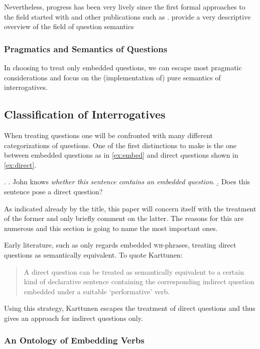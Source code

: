 \documentclass[a4paper,fontsize=12pt]{article}
\newcommand{\term}{\textsf} %
\newcommand{\wh}{\textsc{wh}} %
\theoremstyle{remark} \newtheorem*{termin}{Definition} %
\begin{document}
Nevertheless, progress has been very lively since the first
formal approaches to the field started with \cite{hamblin:q} and other
publications such as %
. \cite{gs:q} provide a very descriptive overview of the field of question
semantics

\subsubsection{Pragmatics and Semantics of Questions}

In choosing to treat only embedded questions, we can escape most pragmatic
considerations and focus on the (implementation of) pure semantics of
interrogatives.

\subsection{Classification of Interrogatives}

When treating questions one will be confronted with many different
categorizations of questions. One of the first distinctions to make is the one
between \term{embedded questions} as in \ref{ex:embed} and \term{direct
questions} shown in \ref{ex:direct}.

\ex. \a. John knows \emph{whether this sentence contains an embedded
question}.\label{ex:embed}
\b. Does this sentence pose a direct question?\label{ex:direct}

As indicated already by the title, this paper will concern itself with the
treatment of the former and only briefly comment on the latter. The reasons for
this are numerous  %
and this section is going to name the most important ones.

Early literature, such as \cite{karttunen:1977} only regards embedded
\wh-phrases, treating direct questions as semantically equivalent. To quote
Karttunen:

\begin{quote}A direct question can be treated as semantically equivalent to a
certain kind of declarative sentence containing the corresponding indirect
question embedded under  a suitable `performative' verb.\end{quote}

Using this strategy, Karttunen escapes the treatment of direct  questions and
thus gives an approach for indirect questions only.

\subsubsection{An Ontology of Embedding Verbs}
\end{document}
